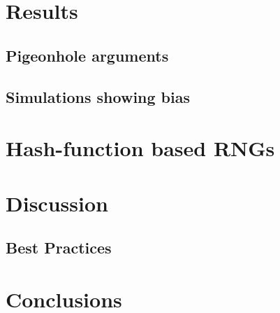 \documentclass[12pt]{article}
\begin{document}
\section{Results}
\subsection{Pigeonhole arguments}
\subsection{Simulations showing bias}
\section{Hash-function based RNGs}
\section{Discussion}
\subsection{Best Practices}
\section{Conclusions}
\end{document}
